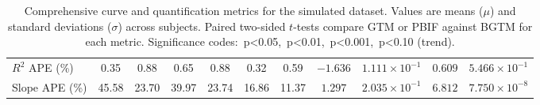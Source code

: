 \begin{sidewaystable}[b]
\begin{tabular}{l|cc|cc|cc|cc|cc}
		\(R^2\) APE (\%)                 & 0.35                               & 0.88                              & 0.65                               & 0.88                                      & 0.32                                      & 0.59       & \(-1.636\) & \(1.111\times10^{-1}\)        & \(0.609\) & \(5.466\times10^{-1}\)  \\
		Slope APE (\%)                   & 45.58                              & 23.70                             & 39.97                              & 23.74                                     & 16.86                                     & 11.37      & \(1.297\)  & \(2.035\times10^{-1}\)        & \(6.812\) & \(7.750\times10^{-8}\)  \\
		\bottomrule
	\end{tabular}
	\caption{Comprehensive curve and quantification metrics for the simulated dataset.
		Values are means (\(\mu\)) and standard deviations (\(\sigma\)) across subjects.
		Paired two-sided \(t\)-tests compare GTM or PBIF against BGTM for each metric.
		Significance codes: \sym{*}\,p<0.05, \sym{**}\,p<0.01, \sym{***}\,p<0.001, \sym{\dag}\,p<0.10 (trend).}
	\label{tab:metrics_all_sim}
\end{sidewaystable}


